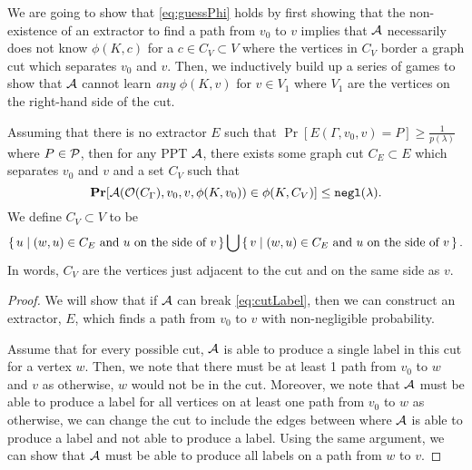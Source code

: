 We are going to show that \cref{eq:guessPhi} holds by first showing that
the non-existence of an extractor to find a path from $v_0$ to $v$ implies that $\mathcal{A}$
necessarily does not know $\phi(K, c)$ for a $c \in C_V \subset V$ where the vertices in $C_V$ border 
a graph cut which separates $v_0$ and $v$. Then, we inductively build up a series of games to show that
$\mathcal{A}$ cannot learn \emph{any} $\phi(K, v)$ for $v \in V_1$ where $V_1$ are the vertices on the right-hand side of the cut.

\begin{lemma}
	Assuming that there is no extractor $E$ such that $\Pr[E(\Gamma, v_0, v) = P] \geq \frac{1}{p(\lambda)}$
	where $P \in \mathcal{P}$, then for any PPT $\mathcal{A}$, there exists some graph cut 
	$C_E \subset E$ which separates $v_0$ and $v$ and a set $C_V$ such that
	\begin{equation}
		\label{eq:cutLabel}
		\operatorname*{\mathbf{Pr}}[\mathcal{A}(\mathcal{O}(C_\Gamma), v_0, v, \phi(K, v_0)) \in \phi(K, C_V)] \leq \texttt{negl}(\lambda).
	\end{equation}
		We define $C_V \subset V$ to be
	\begin{equation*}
		\set{ u \mid (w, u) \in C_E \text{ and } u \text { on the side of } v} \bigcup \set{ v \mid (w, u) \in C_E \text{ and } u \text { on the side of } v}.
	\end{equation*}
	In words, $C_V$ are the vertices just adjacent to the cut and on the same side as $v$.
	\begin{proof}
		We will show that if $\mathcal{A}$ can break \cref{eq:cutLabel}, then we can construct an extractor,
		$E$, which finds a path from $v_0$ to $v$ with non-negligible probability.

		Assume that for every possible cut, $\mathcal{A}$ is able to produce a single label in this cut for a vertex $w$.
		Then, we note that there must be at least 1 path from $v_0$ to $w$ and $v$ as otherwise, $w$ would not be in the cut.
		Moreover, we note that $\mathcal{A}$ must be able to produce a label for all vertices on at least one path
		from $v_0$ to $w$ as otherwise, we can change the cut to include the edges between where
		$\mathcal{A}$ is able to produce a label and not able to produce a label. Using the same argument,
		we can show that $\mathcal{A}$ must be able to produce all labels on a path from $w$ to $v$.


\end{proof}
\end{lemma}
